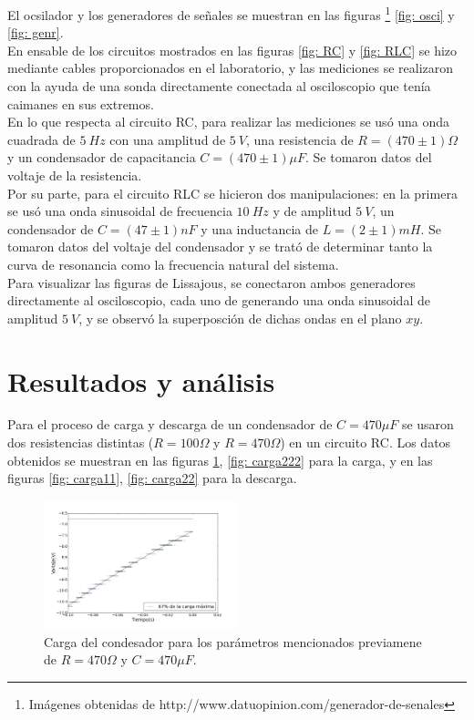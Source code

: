 \documentclass[prb,aps,twocolumn,preprintnumbers,amsmath,amssymb]{revtex4}
\begin{document}
El ocsilador y los generadores de señales se muestran en las figuras \footnote{Imágenes obtenidas de http://www.datuopinion.com/generador-de-senales} \ref{fig: osci} y \ref{fig: genr}.\\

En ensable de los circuitos mostrados en las figuras \ref{fig: RC} y \ref{fig: RLC} se hizo mediante cables proporcionados en el laboratorio, y las mediciones se realizaron con la ayuda de una sonda directamente conectada al osciloscopio que tenía caimanes en sus extremos.\\

En lo que respecta al circuito RC, para realizar las mediciones se usó una onda cuadrada de $5\ Hz$ con una amplitud de $5\ V$, una resistencia de $R = (470 \pm 1)\Omega$ y un condensador de capacitancia $C = (470 \pm 1)\mu F$. Se tomaron datos del voltaje de la resistencia.\\

Por su parte, para el circuito RLC se hicieron dos manipulaciones: en la primera se usó una onda sinusoidal de frecuencia $10\ Hz$ y de amplitud $5\ V$, un condensador de $C = (47 \pm 1)nF$ y una inductancia de $L = (2 \pm 1)mH$. Se tomaron datos del voltaje del condensador y se trató de determinar tanto la curva de resonancia como la frecuencia natural del sistema.\\

Para visualizar las figuras de Lissajous, se conectaron ambos generadores directamente al osciloscopio, cada uno de generando una onda sinusoidal de amplitud $5\ V$, y se observó la superposción de dichas ondas en el plano $xy$.

\section{Resultados y análisis}

Para el proceso de carga y descarga de un condensador de $C = 470 \mu F$ se usaron dos resistencias distintas ($R = 100 \Omega$ y $R = 470 \Omega$) en un circuito RC. Los datos obtenidos se muestran en las figuras \ref{fig: carga111}, \ref{fig: carga222} para la carga, y en las figuras \ref{fig: carga11}, \ref{fig: carga22} para la descarga.

\begin{figure}[h!]
	\centering
	\includegraphics[width=0.5\textwidth,height=0.25\textheight]{carga111}
	\caption{Carga del condesador para los parámetros mencionados previamene de $R = 470 \Omega$ y $C = 470 \mu F$.}
	\label{fig: carga111}
\end{figure}
\end{document}
